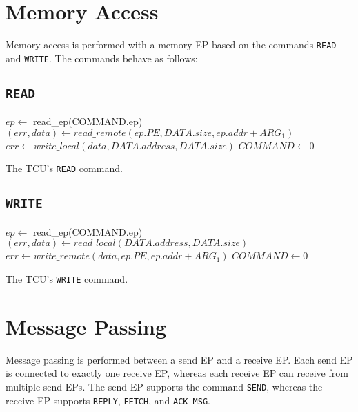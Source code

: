 \section{Memory Access}

Memory access is performed with a memory EP based on the commands \texttt{READ} and \texttt{WRITE}.
The commands behave as follows:

\subsection{\texttt{READ}}

\begin{algorithm}[H]
    $ep \gets$ read\_ep(COMMAND.ep)\;
    \BlankLine
    $(err, data) \gets read\_remote(ep.PE, DATA.size, ep.addr + ARG_1)$\;
    \BlankLine
    $err \gets write\_local(data, DATA.address, DATA.size)$\;
    $COMMAND \gets 0$\;
    \caption{The TCU's \texttt{READ} command.}
\end{algorithm}

\subsection{\texttt{WRITE}}

\begin{algorithm}[H]
    $ep \gets$ read\_ep(COMMAND.ep)\;
    \BlankLine
    $(err, data) \gets read\_local(DATA.address, DATA.size)$\;
    $err \gets write\_remote(data, ep.PE, ep.addr + ARG_1)$\;
    \BlankLine
    $COMMAND \gets 0$\;
    \caption{The TCU's \texttt{WRITE} command.}
\end{algorithm}

\section{Message Passing}

Message passing is performed between a send EP and a receive EP. Each send EP is connected to
exactly one receive EP, whereas each receive EP can receive from multiple send EPs. The send EP
supports the command \texttt{SEND}, whereas the receive EP supports \texttt{REPLY}, \texttt{FETCH},
and \texttt{ACK\_MSG}.

